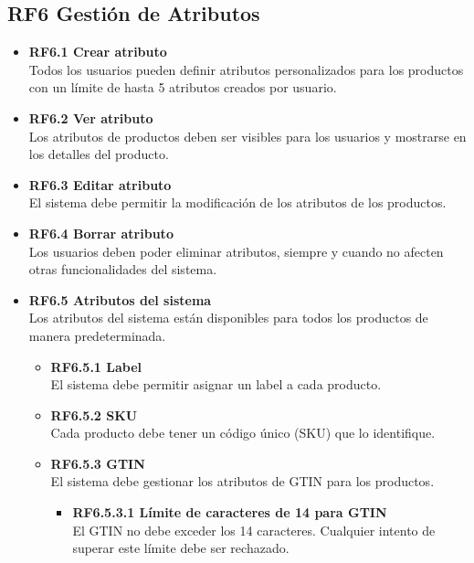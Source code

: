 \documentclass[12pt.a4paper]{article}
\begin{document}
\subsection*{RF6 Gestión de Atributos}

\begin{itemize}
    \item \textbf{RF6.1 Crear atributo} \\
    Todos los usuarios pueden definir atributos personalizados para los productos con un límite de hasta 5 atributos creados por usuario.

    \item \textbf{RF6.2 Ver atributo} \\
    Los atributos de productos deben ser visibles para los usuarios y mostrarse en los detalles del producto.

    \item \textbf{RF6.3 Editar atributo} \\
    El sistema debe permitir la modificación de los atributos de los productos.

    \item \textbf{RF6.4 Borrar atributo} \\
    Los usuarios deben poder eliminar atributos, siempre y cuando no afecten otras funcionalidades del sistema.

    \item \textbf{RF6.5 Atributos del sistema} \\
    Los atributos del sistema están disponibles para todos los productos de manera predeterminada.
    \begin{itemize}
        \item \textbf{RF6.5.1 Label} \\
        El sistema debe permitir asignar un label a cada producto.

        \item \textbf{RF6.5.2 SKU} \\
        Cada producto debe tener un código único (SKU) que lo identifique.

        \item \textbf{RF6.5.3 GTIN} \\
        El sistema debe gestionar los atributos de GTIN para los productos.
        \begin{itemize}
            \item \textbf{RF6.5.3.1 Límite de caracteres de 14 para GTIN} \\
            El GTIN no debe exceder los 14 caracteres. Cualquier intento de superar este límite debe ser rechazado.


\end{itemize}
\end{itemize}
\end{itemize}
\end{document}
